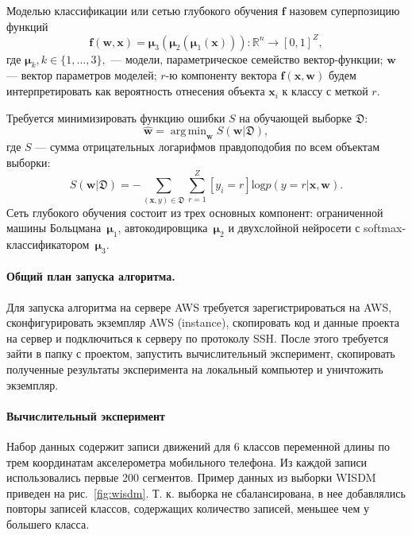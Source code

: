 \documentclass[12pt]{article}
\DeclareMathOperator*{\argmin}{arg\,min}
\begin{document}
Моделью классификации или сетью глубокого обучения $\mathbf{f}$ назовем суперпозицию функций
\begin{equation}
\label{eq:main}
 \mathbf{f}(\mathbf{w}, \mathbf{x}) = \boldsymbol{{\mu}}_3(\boldsymbol{\mu}_2( \boldsymbol{\mu}_1(\mathbf{x}))): \mathbb{R}^n \to [0,1]^Z,
\end{equation}
где $\boldsymbol{\mu}_k, k \in \{1,\dots,3\},$ --- модели, параметрическое семейство вектор-функции; $\mathbf{w}$ --- вектор параметров моделей;
$r$-ю компоненту вектора $\mathbf{f}(\mathbf{x},\mathbf{w})$ будем интерпретировать как вероятность отнесения объекта $\mathbf{x}_i$ к классу с меткой $r$.

Требуется минимизировать функцию ошибки $S$ на обучающей выборке $\mathfrak{D}$:
\[
 \hat{\mathbf{w}} = \argmin_\mathbf{w} S(\mathbf{w}|\mathfrak{D}),
\]
где $S$ --- сумма отрицательных логарифмов правдоподобия по всем объектам выборки:
\[
 S(\mathbf{w}|\mathfrak{D}) = -\sum_{(\mathbf{x},y) \in \mathfrak{D} } \sum_{r=1}^Z [y_i = r] \text{log} p(y=r|\mathbf{x},\mathbf{w}).
\]
Сеть глубокого обучения состоит из трех основных компонент:
ограниченной машины Больцмана~$\boldsymbol{\mu}_1$, автокодировщика~$\boldsymbol{\mu}_2$ и двухслойной нейросети с softmax-классификатором~$\boldsymbol{\mu}_3$.


\paragraph{Общий план запуска алгоритма.}
Для запуска алгоритма на сервере AWS требуется зарегистрироваться на AWS, сконфигурировать экземпляр AWS (instance), скопировать код и данные проекта на сервер и подключиться к серверу по протоколу SSH. После этого требуется зайти в папку с проектом, запустить вычислительный эксперимент, скопировать полученные результаты эксперимента на локальный компьютер и уничтожить экземпляр.

\paragraph{Вычислительный эксперимент}
Набор данных содержит записи движений для 6 классов переменной длины по трем координатам  акселерометра мобильного телефона. Из каждой записи использовались первые 200 сегментов. Пример данных из выборки WISDM приведен на рис.~\ref{fig:wisdm}. Т. к. выборка не сбалансирована, в нее добавлялись повторы записей классов, содержащих количество записей, меньшее чем у большего класса.
\end{document}
